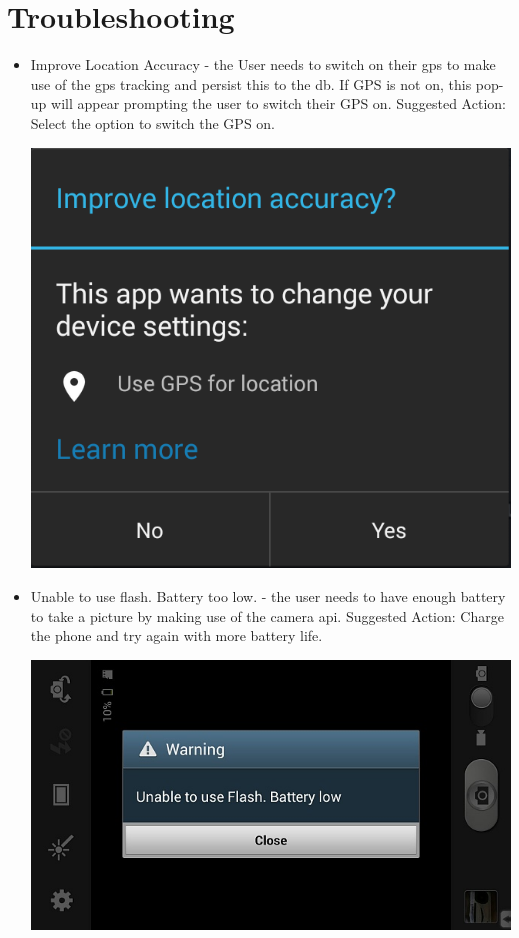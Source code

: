\documentclass[11pt,a4paper,titlepage]{article}
\begin{document}
\section{Troubleshooting}
	\begin{itemize}
		\item Improve Location Accuracy - the User needs to switch on their gps to make use of the gps tracking and persist this to the db. If GPS is not on, this pop-up will appear prompting the user to switch their GPS on. \newline
		Suggested Action: Select the option to switch the GPS on. \newline
		
		\begin{center}
				\includegraphics[scale=0.13]{CAPTURE}
		\end{center}
		
		\item Unable to use flash. Battery too low. - the user needs to have enough battery to take a picture by making use of the camera api. \newline
		Suggested Action: Charge the phone and try again with more battery life. \newline
		
		\begin{center}
				\includegraphics[scale=0.13]{Battery_Low}
		\end{center}
	\end{itemize}
\end{document}

